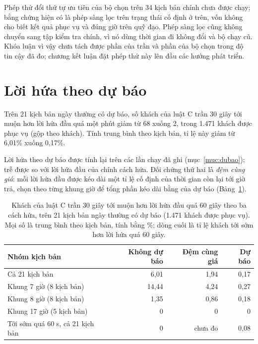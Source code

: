 Phép thử đổi thứ tự ưu tiên của bộ chọn trên 34 kịch bản chính chưa được chạy; bằng chứng hiện có là phép sàng lọc
trên trạng thái cố định ở trên, vốn không cho biết kết quả phục vụ và đúng giờ trên quỹ đạo. Phép sàng lọc cũng không
chuyển sang tập kiểm tra chính, vì nó dùng thời gian đi không đổi và bộ chạy cũ. Khóa luận vì vậy chưa tách được phần
của trần và phần của bộ chọn trong độ tin cậy đã đo; chương kết luận đặt phép thử này lên đầu các hướng phát triển.

\section{Lời hứa theo dự báo}
\label{muc:c4-dubao}

Trên 21 kịch bản ngày thường có dự báo, số khách của luật C trần 30 giây tới muộn hơn lời hứa đầu quá một phút
giảm từ 68 xuống 2, trong 1.471 khách được phục vụ (gộp theo khách). Tính trung bình theo kịch bản, tỉ lệ này giảm
từ 6,01\% xuống 0,17\%.

Lời hứa theo dự báo được tính lại trên các lần chạy đã ghi (mục~\ref{muc:dubao}); trễ được so với lời hứa đầu của
chính cách hứa. Đối chứng thứ hai là \emph{đệm cùng giá}: mỗi lời hứa đầu được kéo dài một tỉ lệ cố định của thời
gian còn lại tới giờ trả, chọn theo từng khung giờ để tổng phần kéo dài bằng của dự báo (Bảng~\ref{bang:c4-dubao}).

\begin{table}[htbp]
\centering
\caption{Khách của luật C trần 30 giây tới muộn hơn lời hứa đầu quá 60 giây theo ba cách hứa, trên 21 kịch bản
ngày thường có dự báo (1.471 khách được phục vụ). Mọi số là trung bình theo kịch bản, tính bằng \%; dòng cuối là
tỉ lệ khách tới sớm hơn lời hứa quá 60 giây.}
\label{bang:c4-dubao}
\small
\begin{tabular}{@{}lrrr@{}}
\toprule
\textbf{Nhóm kịch bản} & \textbf{Không dự báo} & \textbf{Đệm cùng giá} & \textbf{Dự báo}\\
\midrule
Cả 21 kịch bản & 6,01 & 1,94 & 0,17\\
Khung 7 giờ (8 kịch bản) & 14,44 & 4,24 & 0,27\\
Khung 8 giờ (8 kịch bản) & 1,35 & 0,86 & 0,18\\
Khung 17 giờ (5 kịch bản) & 0 & 0 & 0\\
\midrule
Tới sớm quá 60 s, cả 21 kịch bản & 0 & chưa đo & 0,08\\
\bottomrule
\end{tabular}
\end{table}

